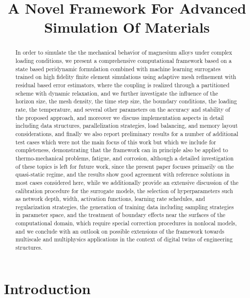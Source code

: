 \documentclass{article}
\begin{document}
\title{A Novel Framework For Advanced Simulation Of Materials}  %
\maketitle

\begin{abstract}
In order to simulate the the mechanical behavior of magnesium alloys under
complex loading conditions, we present a comprehensive computational framework
based on a state based peridynamic formulation combined with machine learning
surrogates trained on high fidelity finite element simulations using adaptive
mesh refinement with residual based error estimators, where the coupling is
realized through a partitioned scheme with dynamic relaxation, and we further
investigate the influence of the horizon size, the mesh density, the time step
size, the boundary conditions, the loading rate, the temperature, and several
other parameters on the accuracy and stability of the proposed approach, and
moreover we discuss implementation aspects in detail including data structures,
parallelization strategies, load balancing, and memory layout considerations,
and finally we also report preliminary results for a number of additional test
cases which were not the main focus of this work but which we include for
completeness, demonstrating that the framework can in principle also be applied
to thermo-mechanical problems, fatigue, and corrosion, although a detailed
investigation of these topics is left for future work, since the present paper
focuses primarily on the quasi-static regime, and the results show good
agreement with reference solutions in most cases considered here, while we
additionally provide an extensive discussion of the calibration procedure for
the surrogate models, the selection of hyperparameters such as network depth,
width, activation functions, learning rate schedules, and regularization
strategies, the generation of training data including sampling strategies in
parameter space, and the treatment of boundary effects near the surfaces of
the computational domain, which require special correction procedures in
nonlocal models, and we conclude with an outlook on possible extensions of
the framework towards multiscale and multiphysics applications in the context
of digital twins of engineering structures.
\end{abstract}

\section{Introduction}  %
\end{document}
